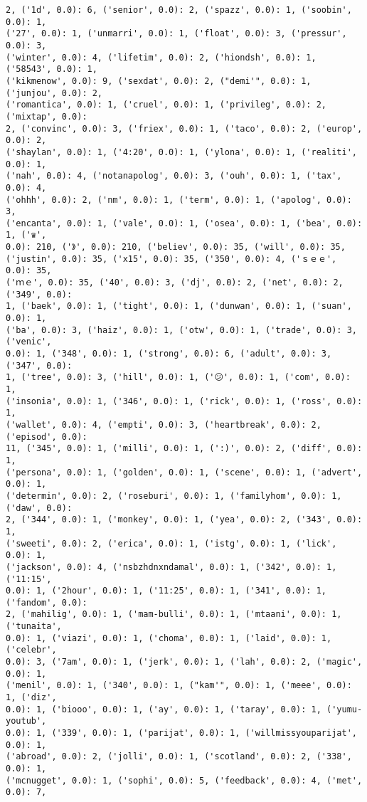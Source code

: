 \documentclass[11pt]{article}
\begin{document}
\begin{Verbatim}[commandchars=\\\{\}]
2, ('1d', 0.0): 6, ('senior', 0.0): 2, ('spazz', 0.0): 1, ('soobin', 0.0): 1,
('27', 0.0): 1, ('unmarri', 0.0): 1, ('float', 0.0): 3, ('pressur', 0.0): 3,
('winter', 0.0): 4, ('lifetim', 0.0): 2, ('hiondsh', 0.0): 1, ('58543', 0.0): 1,
('kikmenow', 0.0): 9, ('sexdat', 0.0): 2, ("demi'", 0.0): 1, ('junjou', 0.0): 2,
('romantica', 0.0): 1, ('cruel', 0.0): 1, ('privileg', 0.0): 2, ('mixtap', 0.0):
2, ('convinc', 0.0): 3, ('friex', 0.0): 1, ('taco', 0.0): 2, ('europ', 0.0): 2,
('shaylan', 0.0): 1, ('4:20', 0.0): 1, ('ylona', 0.0): 1, ('realiti', 0.0): 1,
('nah', 0.0): 4, ('notanapolog', 0.0): 3, ('ouh', 0.0): 1, ('tax', 0.0): 4,
('ohhh', 0.0): 2, ('nm', 0.0): 1, ('term', 0.0): 1, ('apolog', 0.0): 3,
('encanta', 0.0): 1, ('vale', 0.0): 1, ('osea', 0.0): 1, ('bea', 0.0): 1, ('♛',
0.0): 210, ('》', 0.0): 210, ('beli̇ev', 0.0): 35, ('wi̇ll', 0.0): 35,
('justi̇n', 0.0): 35, ('x15', 0.0): 35, ('350', 0.0): 4, ('ｓｅｅ', 0.0): 35,
('ｍｅ', 0.0): 35, ('40', 0.0): 3, ('dj', 0.0): 2, ('net', 0.0): 2, ('349', 0.0):
1, ('baek', 0.0): 1, ('tight', 0.0): 1, ('dunwan', 0.0): 1, ('suan', 0.0): 1,
('ba', 0.0): 3, ('haiz', 0.0): 1, ('otw', 0.0): 1, ('trade', 0.0): 3, ('venic',
0.0): 1, ('348', 0.0): 1, ('strong', 0.0): 6, ('adult', 0.0): 3, ('347', 0.0):
1, ('tree', 0.0): 3, ('hill', 0.0): 1, ('😕', 0.0): 1, ('com', 0.0): 1,
('insonia', 0.0): 1, ('346', 0.0): 1, ('rick', 0.0): 1, ('ross', 0.0): 1,
('wallet', 0.0): 4, ('empti', 0.0): 3, ('heartbreak', 0.0): 2, ('episod', 0.0):
11, ('345', 0.0): 1, ('milli', 0.0): 1, (':)', 0.0): 2, ('diff', 0.0): 1,
('persona', 0.0): 1, ('golden', 0.0): 1, ('scene', 0.0): 1, ('advert', 0.0): 1,
('determin', 0.0): 2, ('roseburi', 0.0): 1, ('familyhom', 0.0): 1, ('daw', 0.0):
2, ('344', 0.0): 1, ('monkey', 0.0): 1, ('yea', 0.0): 2, ('343', 0.0): 1,
('sweeti', 0.0): 2, ('erica', 0.0): 1, ('istg', 0.0): 1, ('lick', 0.0): 1,
('jackson', 0.0): 4, ('nsbzhdnxndamal', 0.0): 1, ('342', 0.0): 1, ('11:15',
0.0): 1, ('2hour', 0.0): 1, ('11:25', 0.0): 1, ('341', 0.0): 1, ('fandom', 0.0):
2, ('mahilig', 0.0): 1, ('mam-bulli', 0.0): 1, ('mtaani', 0.0): 1, ('tunaita',
0.0): 1, ('viazi', 0.0): 1, ('choma', 0.0): 1, ('laid', 0.0): 1, ('celebr',
0.0): 3, ('7am', 0.0): 1, ('jerk', 0.0): 1, ('lah', 0.0): 2, ('magic', 0.0): 1,
('menil', 0.0): 1, ('340', 0.0): 1, ("kam'", 0.0): 1, ('meee', 0.0): 1, ('diz',
0.0): 1, ('biooo', 0.0): 1, ('ay', 0.0): 1, ('taray', 0.0): 1, ('yumu-youtub',
0.0): 1, ('339', 0.0): 1, ('parijat', 0.0): 1, ('willmissyouparijat', 0.0): 1,
('abroad', 0.0): 2, ('jolli', 0.0): 1, ('scotland', 0.0): 2, ('338', 0.0): 1,
('mcnugget', 0.0): 1, ('sophi', 0.0): 5, ('feedback', 0.0): 4, ('met', 0.0): 7,

\end{Verbatim}
\end{document}
